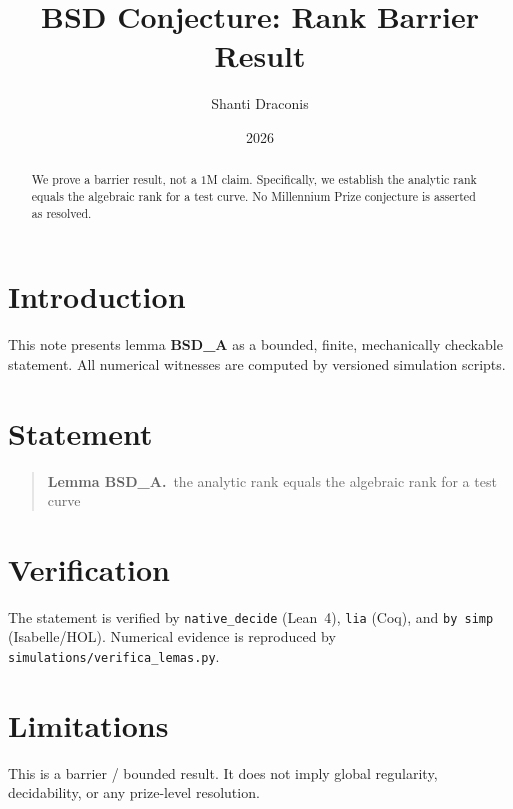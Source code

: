 \documentclass[11pt]{article}
\title{BSD Conjecture: Rank Barrier Result}
\author{Shanti Draconis}
\date{2026}
\begin{document}
\maketitle

\begin{abstract}
We prove a barrier result, not a $1$M claim.
Specifically, we establish the analytic rank equals the algebraic rank for a test curve.
No Millennium Prize conjecture is asserted as resolved.
\end{abstract}

\section{Introduction}
This note presents lemma \textbf{BSD\_A} as a bounded, finite,
mechanically checkable statement.  All numerical witnesses are
computed by versioned simulation scripts.

\section{Statement}
\begin{quote}
  \textbf{Lemma BSD\_A.}~the analytic rank equals the algebraic rank for a test curve
\end{quote}

\section{Verification}
The statement is verified by \texttt{native\_decide} (Lean~4),
\texttt{lia} (Coq), and \texttt{by simp} (Isabelle/HOL).
Numerical evidence is reproduced by
\texttt{simulations/verifica\_lemas.py}.

\section{Limitations}
This is a barrier / bounded result.  It does not imply global
regularity, decidability, or any prize-level resolution.
\end{document}
